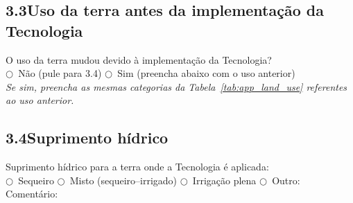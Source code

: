 \subsection{3.3\quad Uso da terra antes da implementação da Tecnologia}

O uso da terra mudou devido à implementação da Tecnologia?\\
$\bigcirc$~Não (pule para 3.4) \qquad $\bigcirc$~Sim (preencha abaixo com o uso anterior)\\[4pt]
\textit{Se sim, preencha as mesmas categorias da Tabela~\ref{tab:app_land_use} referentes ao uso anterior.}

\subsection{3.4\quad Suprimento hídrico}

Suprimento hídrico para a terra onde a Tecnologia é aplicada:\\
$\bigcirc$~Sequeiro \quad $\bigcirc$~Misto (sequeiro--irrigado) \quad $\bigcirc$~Irrigação plena \quad $\bigcirc$~Outro: \dotfill\\
Comentário: \dotfill

